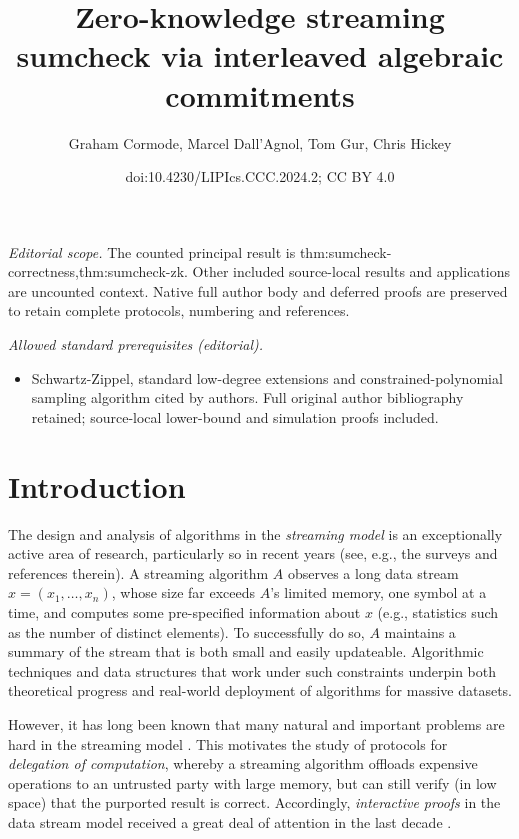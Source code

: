 \documentclass[10pt,a4paper]{article}
\title{Zero-knowledge streaming sumcheck via interleaved algebraic commitments}
\author{Graham Cormode, Marcel Dall'Agnol, Tom Gur, Chris Hickey}
\date{doi:10.4230/LIPIcs.CCC.2024.2; CC BY 4.0}
\theoremstyle{definition}
\begin{document}
\maketitle
\noindent\textit{Editorial scope.} The counted principal result is thm:sumcheck-correctness,thm:sumcheck-zk. Other included source-local results and applications are uncounted context. Native full author body and deferred proofs are preserved to retain complete protocols, numbering and references.\par\medskip
\noindent\textit{Allowed standard prerequisites (editorial).}\begin{itemize}
\item Schwartz-Zippel, standard low-degree extensions and constrained-polynomial sampling algorithm cited by authors. Full original author bibliography retained; source-local lower-bound and simulation proofs included.
\end{itemize}\medskip
\section{Introduction}
\label{sec:intro}

The design and analysis of algorithms in the \emph{streaming model} is an exceptionally active area of research, particularly so in recent years (see, e.g., the surveys \cite{M05, M14, C23} and references therein). A streaming algorithm $A$ observes a long data stream $x = (x_1, \ldots, x_n)$, whose size far exceeds $A$'s limited memory, one symbol at a time, and computes some pre-specified information about $x$ (e.g., statistics such as the number of distinct elements). To successfully do so, $A$ maintains a summary of the stream that is both small and easily updateable. Algorithmic techniques and data structures that work under such constraints underpin both theoretical progress and real-world deployment of algorithms for massive datasets.   

However, it has long been known that many natural and important problems are hard in the streaming model \cite{AMS99}. This motivates the study of protocols for \emph{delegation of computation}, whereby a streaming algorithm offloads expensive operations to an untrusted party with large memory, but can still verify (in low space) that the purported result is correct.  
Accordingly, \emph{interactive proofs} in the data stream model received a great deal of attention in the last decade \cite{CTY11, CMT12, CMT13, T13, CCGT14, T14, CCMTV15, DTV15, CH18, CG19, CGT20}.
\end{document}
